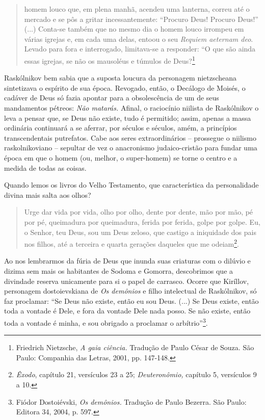 \begin{quote}
homem louco que, em plena manhã, acendeu uma lanterna, correu até o
mercado e se pôs a gritar incessantemente: ``Procuro Deus! Procuro
Deus!'' (...) Conta-se também que no mesmo dia o homem louco irrompeu em
várias igrejas e, em cada uma delas, entoou o seu \emph{Requiem aeternam
deo}. Levado para fora e interrogado, limitava-se a responder: ``O que
são ainda essas igrejas, se não os mausoléus e túmulos de
Deus?\footnote{Friedrich Nietzsche, \emph{A gaia ciência.} Tradução de
  Paulo César de Souza. São Paulo: Companhia das Letras, 2001, pp.
  147-148.}
\end{quote}

Raskólnikov bem sabia que a suposta loucura da personagem nietzscheana
sintetizava o espírito de sua época. Revogado, então, o Decálogo de
Moisés, o cadáver de Deus só fazia apontar para a obsolescência de um de
seus mandamentos pétreos: \emph{Não matarás.} Afinal, o raciocínio
niilista de Raskólnikov o leva a pensar que, se Deus não existe, tudo é
permitido; assim, apenas a massa ordinária continuará a se aferrar, por
séculos e séculos, amém, a princípios transcendentais putrefatos. Cabe
aos seres extraordinários -- prossegue o niilismo raskolnikoviano --
sepultar de vez o anacronismo judaico-cristão para fundar uma época em
que o homem (ou, melhor, o super-homem) se torne o centro e a medida de
todas as coisas.

Quando lemos os livros do Velho Testamento, que característica da
personalidade divina mais salta aos olhos?

\begin{quote}
Urge dar vida por vida, olho por olho, dente por dente, mão por mão, pé
por pé, queimadura por queimadura, ferida por ferida, golpe por golpe.
Eu, o Senhor, teu Deus, sou um Deus zeloso, que castigo a iniquidade dos
pais nos filhos, até a terceira e quarta gerações daqueles que me
odeiam\footnote{\emph{Êxodo}, capítulo 21, versículos 23 a 25;
  \emph{Deuteronômio,} capítulo 5, versículos 9 a 10.}.
\end{quote}

Ao nos lembrarmos da fúria de Deus que inunda suas criaturas com o
dilúvio e dizima sem mais os habitantes de Sodoma e Gomorra, descobrimos
que a divindade reserva unicamente para si o papel de carrasco. Ocorre
que Kiríllov, personagem dostoievskiana de \emph{Os demônios} e filho
intelectual de Raskólnikov, só faz proclamar: ``Se Deus não existe,
então eu sou Deus. (...) Se Deus existe, então toda a vontade é Dele, e
fora da vontade Dele nada posso. Se não existe, então toda a vontade é
minha, e sou obrigado a proclamar o arbítrio''\footnote{Fiódor
  Dostoiévski, \emph{Os demônios.} Tradução de Paulo Bezerra. São Paulo:
  Editora 34, 2004, p. 597.}.

